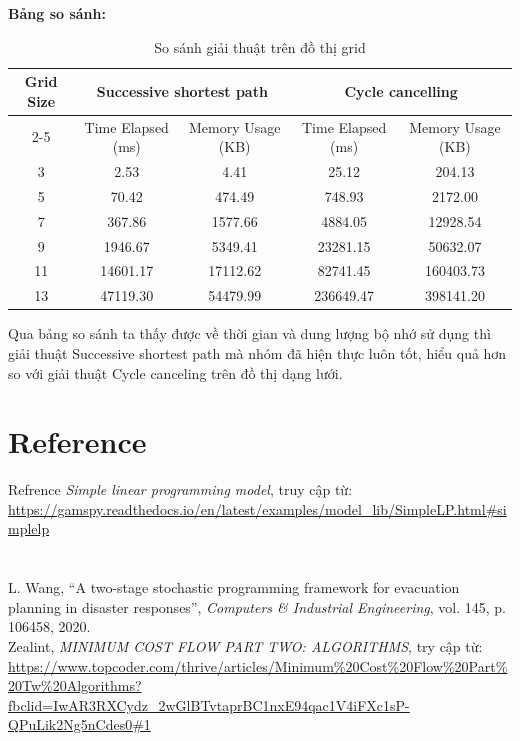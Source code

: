 \documentclass[a4paper]{article}
\begin{document}
\begin{enumerate}
        \textbf{Bảng so sánh:}
        \begin{table}[H]
            \centering
            \caption{So sánh giải thuật trên đồ thị grid}
            \begin{tabular}{|c|c|c|c|c|}
                \hline
                \multirow{2}{*}{Grid Size} & \multicolumn{2}{c|}{Successive shortest path} & \multicolumn{2}{c|}{Cycle cancelling} \\
                \cline{2-5}
                & Time Elapsed (ms) & Memory Usage (KB) & Time Elapsed (ms) & Memory Usage (KB) \\
                \hline
                3 & 2.53 & 4.41 & 25.12 & 204.13 \\
                \hline
                5 & 70.42 & 474.49 & 748.93 & 2172.00 \\
                \hline
                7 & 367.86 & 1577.66 & 4884.05 & 12928.54 \\
                \hline
                9 & 1946.67 & 5349.41 & 23281.15 & 50632.07 \\
                \hline
                11 & 14601.17 & 17112.62 & 82741.45 & 160403.73 \\
                \hline
                13 & 47119.30 & 54479.99 & 236649.47 & 398141.20 \\
                \hline
            \end{tabular}
            \label{tab:comparison}
        \end{table}
        
         Qua bảng so sánh ta thấy được về thời gian và dung lượng bộ nhớ sử dụng thì giải thuật Successive shortest path mà nhóm đã hiện thực luôn tốt, hiểu quả hơn so với giải thuật Cycle canceling trên đồ thị dạng lưới. 
    \end{enumerate} 
    

\newpage
\section{Reference}
\text[1] Refrence \textit{Simple linear programming model}, truy cập từ:  \url{https://gamspy.readthedocs.io/en/latest/examples/model_lib/SimpleLP.html#simplelp}\\
\\
\\
\text[3]  L. Wang, “A two-stage stochastic programming framework for evacuation planning in disaster responses”, \textit{Computers \& Industrial Engineering}, vol. 145, p. 106458, 2020.\\
\text[4] Zealint, \textit{MINIMUM COST FLOW PART TWO: ALGORITHMS}, try cập từ:
\url{https://www.topcoder.com/thrive/articles/Minimum%20Cost%20Flow%20Part%20Tw%20Algorithms?fbclid=IwAR3RXCydz_2wGlBTvtaprBC1nxE94qac1V4iFXc1sP-QPuLik2Ng5nCdes0#1}
\end{document}
